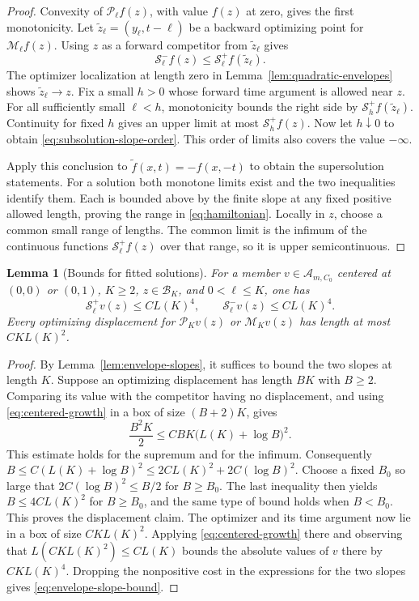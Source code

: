 \documentclass[11pt]{article}
\numberwithin{equation}{section}
\newtheorem{lemma}[theorem]{Lemma}
\theoremstyle{definition}
\theoremstyle{remark}
\newcommand{\Penv}{\mathcal{P}}
\newcommand{\Menv}{\mathcal{M}}
\newcommand{\Senv}{\mathcal{S}}
\newcommand{\Aclass}{\mathcal{A}}
\begin{document}
\begin{proof}
Convexity of $\Penv_\ell f(z)$, with value $f(z)$ at zero,
gives the first monotonicity. Let
$\widetilde z_\ell=(y_\ell,t-\ell)$ be a backward optimizing
point for $\Menv_\ell f(z)$. Using $z$ as a forward competitor
from $\widetilde z_\ell$ gives
\[
  \Senv_\ell^-f(z)\le\Senv_\ell^+f(\widetilde z_\ell).
\]
The optimizer localization at length zero in
Lemma~\ref{lem:quadratic-envelopes} shows
$\widetilde z_\ell\to z$. Fix a small $h>0$ whose forward time
argument is allowed near $z$. For all sufficiently small
$\ell<h$, monotonicity bounds the right side by
$\Senv_h^+f(\widetilde z_\ell)$. Continuity for fixed $h$ gives
an upper limit at most $\Senv_h^+f(z)$. Now let $h\downarrow0$
to obtain \eqref{eq:subsolution-slope-order}. This order of
limits also covers the value $-\infty$.

Apply this conclusion to $\widetilde f(x,t)=-f(x,-t)$ to obtain
the supersolution statements. For a solution both monotone
limits exist and the two inequalities identify them. Each is
bounded above by the finite slope at any fixed positive allowed
length, proving the range in \eqref{eq:hamiltonian}. Locally in
$z$, choose a common small range of lengths. The common limit is
the infimum of the continuous functions $\Senv_\ell^+f(z)$ over
that range, so it is upper semicontinuous.
\end{proof}

\begin{lemma}[Bounds for fitted solutions]\label{lem:fitted-envelope-bounds}
For a member $v\in\Aclass_{m,C_0}$ centered at $(0,0)$ or $(0,1)$, $K\ge2$,
$z\in\mathcal B_K$, and $0<\ell\le K$, one has
\begin{equation}\label{eq:envelope-slope-bound}
  \Senv_\ell^+v(z)\le C L(K)^4,\qquad
  \Senv_\ell^-v(z)\le C L(K)^4.
\end{equation}
Every optimizing displacement for $\Penv_Kv(z)$ or
$\Menv_Kv(z)$ has length at most $C K L(K)^2$.
\end{lemma}

\begin{proof}
By Lemma~\ref{lem:envelope-slopes}, it suffices to bound the two
slopes at length $K$. Suppose an optimizing displacement has
length $BK$ with $B\ge2$. Comparing its value with the
competitor having no displacement, and using
\eqref{eq:centered-growth} in a box of size $(B+2)K$, gives
\[
  \frac{B^2K}{2}
     \le C BK\bigl(L(K)+\log B\bigr)^2.
\]
This estimate holds for the supremum and for the infimum.
Consequently
$B\le C(L(K)+\log B)^2\le2C L(K)^2+2C(\log B)^2$.
Choose a fixed $B_0$ so large that
$2C(\log B)^2\le B/2$ for $B\ge B_0$. The last inequality
then yields $B\le4C L(K)^2$ for $B\ge B_0$, and the same type
of bound holds when $B<B_0$. This proves the displacement
claim. The optimizer and its time argument now lie in a box of
size $C K L(K)^2$. Applying \eqref{eq:centered-growth} there
and observing that $L(C K L(K)^2)\le C L(K)$ bounds the
absolute values of $v$ there by $C K L(K)^4$. Dropping the
nonpositive cost in the expressions for the two slopes gives
\eqref{eq:envelope-slope-bound}.
\end{proof}
\end{document}
